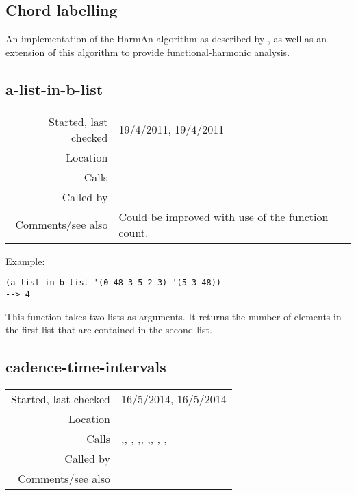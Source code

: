 \subsection{Chord labelling}\label{sec:chord-labelling}

An implementation of the HarmAn algorithm
as described by \cite{pardo2002}, as well as an
extension of this algorithm to provide
functional-harmonic analysis.


\subsection*{a-list-in-b-list}\label{fun:a-list-in-b-list}

\vspace{0.3cm}
\begin{tabular}{r|p{8cm}}
Started, last checked & 19/4/2011, 19/4/2011 \\
Location & \nameref{sec:chord-labelling} \\
Calls & \\
Called by & \nameref{fun:score-segment-against-template} \\
Comments/see also & Could be improved with use of the function count.
\end{tabular}

\vspace{0.5cm}
\noindent Example:
\begin{verbatim}
(a-list-in-b-list '(0 48 3 5 2 3) '(5 3 48))
--> 4
\end{verbatim}

\noindent This function takes two lists as arguments.
It returns the number of elements in the first list
that are contained in the second list.


\subsection*{cadence-time-intervals}\label{fun:cadence-time-intervals}

\vspace{0.3cm}
\begin{tabular}{r|p{8cm}}
Started, last checked & 16/5/2014, 16/5/2014 \\
Location & \nameref{sec:chord-labelling} \\
Calls & \nameref{fun:append-list},\newline \nameref{fun:append-ontimes-to-time-signatures}, \nameref{fun:bar-n-beat-number-of-ontime}, \nameref{fun:firstn-list},\newline \nameref{fun:HarmAn->roman}, \nameref{fun:nth-list},\newline \nameref{fun:nth-list-of-lists}, \nameref{fun:positions}, \nameref{fun:replace-all},\newline \nameref{fun:row-of-max-ontime<=ontime-arg} \\
Called by & \\
Comments/see also &
\end{tabular}


